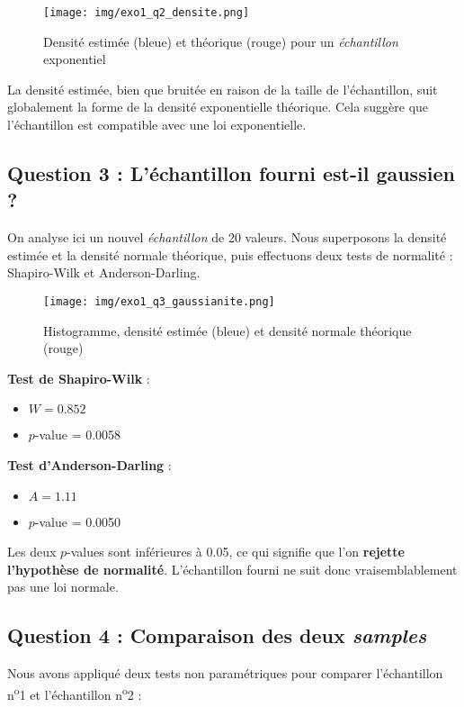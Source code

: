 \documentclass[a4paper,11pt]{article}
\begin{document}
\begin{figure}[h!]
\centering
\texttt{[image: img/exo1\_q2\_densite.png]}
\caption{Densité estimée (bleue) et théorique (rouge) pour un \textit{échantillon} exponentiel}
\end{figure}

\noindent
La densité estimée, bien que bruitée en raison de la taille de l'échantillon, suit globalement la forme de la densité exponentielle théorique. Cela suggère que l'échantillon est compatible avec une loi exponentielle.

\subsection*{Question 3 : L'échantillon fourni est-il gaussien ?}

On analyse ici un nouvel \textit{échantillon} de 20 valeurs. Nous superposons la densité estimée et la densité normale théorique, puis effectuons deux tests de normalité : Shapiro-Wilk et Anderson-Darling.

\begin{figure}[h!]
\centering
\texttt{[image: img/exo1\_q3\_gaussianite.png]}
\caption{Histogramme, densité estimée (bleue) et densité normale théorique (rouge)}
\end{figure}

\noindent
\textbf{Test de Shapiro-Wilk} :
\begin{itemize}
\item $W = 0.852$
\item $p$-value = 0.0058
\end{itemize}

\textbf{Test d'Anderson-Darling} :
\begin{itemize}
\item $A = 1.11$
\item $p$-value = 0.0050
\end{itemize}

Les deux $p$-values sont inférieures à 0.05, ce qui signifie que l'on \textbf{rejette l'hypothèse de normalité}. L'échantillon fourni ne suit donc vraisemblablement pas une loi normale.

\subsection*{Question 4 : Comparaison des deux \textit{samples}}

Nous avons appliqué deux tests non paramétriques pour comparer l'échantillon n\textsuperscript{o}1 et l'échantillon n\textsuperscript{o}2 :
\end{document}
